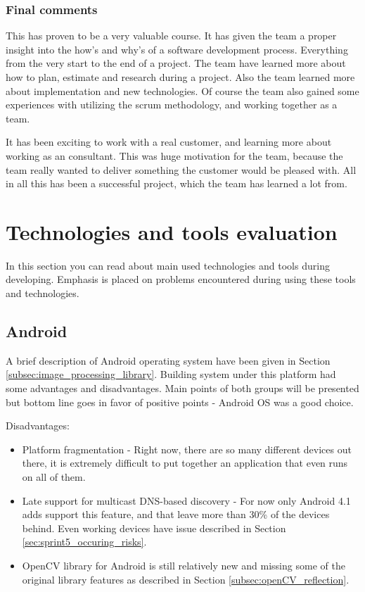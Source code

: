 \subsubsection{Final comments}

This has proven to be a very valuable course. It has given the team a proper insight into the how's and why's of a software development process. Everything from the very start to the end of a project. The team have learned more about how to plan, estimate and research during a project. Also the team learned more about implementation and new technologies. Of course the team also gained some experiences with utilizing the scrum methodology, and working together as a team. 

It has been exciting to work with a real customer, and learning more about working as an consultant. This was huge motivation for the team, because the team really wanted to deliver something the customer would be pleased with. All in all this has been a successful project, which the team has learned a lot from.

\section{Technologies and tools evaluation}
In this section you can read about main used technologies and tools during developing.
Emphasis is placed on problems encountered during using these tools and technologies.

\subsection{Android}
A brief description of Android operating system have been given in Section \ref{subsec:image_processing_library}. Building system under this platform had some advantages and disadvantages. Main points of both groups will be presented but bottom line goes in favor of positive points - Android OS was a good choice.

Disadvantages:
\begin{itemize}
\item Platform fragmentation - Right now, there are so many different devices out there, it is extremely difficult to put together an application that even runs on all of them.
\item Late support for multicast DNS-based discovery - For now only Android 4.1 adds support this feature, and that leave more than 30\% of the devices behind. Even working devices have issue described in Section \ref{sec:sprint5_occuring_risks}.
\item OpenCV library for Android is still relatively new and missing some of the original library features as described in Section \ref{subsec:openCV_reflection}.
\end{itemize}

